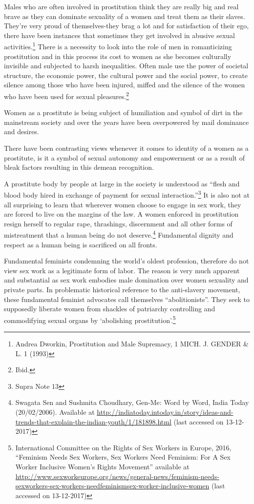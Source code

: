 \begin{multicols}{2}
\noi
Males who are often involved in prostitution think they are really big and real brave as they
can dominate sexuality of a women and treat them as their slaves. They're very proud of themselves-they brag a lot and for satisfaction of their ego, there have been instances that
sometimes they get involved in abusive sexual activities.\footnote{Andrea Dworkin, Prostitution and Male Supremacy, 1 MICH. J. GENDER \& L. 1 (1993)} There is a necessity to look into the
role of men in romanticizing prostitution and in this process its cost to women as she becomes
culturally invisible and subjected to harsh inequalities. Often male use the power of societal
structure, the economic power, the cultural power and the social power, to create silence among
those who have been injured, miffed and the silence of the women who have been used for
sexual pleasures.\footnote{Ibid.}

\noi
Women as a prostitute is being subject of humiliation and symbol of dirt in the mainstream
society and over the years have been overpowered by mail dominance and desires.


\noi
There have been contrasting views whenever it comes to identity of a women as a prostitute, is
it a symbol of sexual autonomy and empowerment or as a result of bleak factors resulting in
this demean recognition.

\noi
A prostitute body by people at large in the society is understood as “flesh and blood body hired
in exchange of payment for sexual interaction.”\footnote{Supra Note 13} It is also not at all surprising to learn that
wherever women choose to engage in sex work, they are forced to live on the margins of the
law. A women enforced in prostitution resign herself to regular rape, thrashings, discernment
and all other forms of mistreatment that a human being do not deserve.\footnote{Swagata Sen and Sushmita Choudhary, Gen-Me: Word by Word, India Today (20/02/2006). Available at \url{http://indiatoday.intoday.in/story/ideas-and-trends-that-explain-the-indian-youth/1/181898.html} (last accessed on 13-12-2017)} Fundamental dignity
and respect as a human being is sacrificed on all fronts.

\noi
Fundamental feminists condemning the world’s oldest profession, therefore do not view sex
work as a legitimate form of labor. The reason is very much apparent and substantial as sex
work embodies male domination over women sexuality and private parts. In problematic
historical reference to the anti-slavery movement, these fundamental feminist advocates call
themselves “abolitionists”. They seek to supposedly liberate women from shackles of
patriarchy controlling and commodifying sexual organs by ‘abolishing prostitution’.\footnote{International Committee on the Rights of Sex Workers in Europe, 2016, “Feminism Needs Sex Workers, Sex Workers Need Feminism: For A Sex Worker Inclusive Women’s Rights Movement” available at \url{http://www.sexworkeurope.org/news/general-news/feminism-needs-sexworkers-sex-workers-needfeminismsex-worker-inclusive-women} (last accessed on 13-12-2017)}


\end{multicols}
